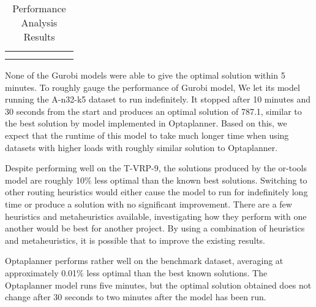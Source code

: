 \begin{table}[!ht]
\begin{tabular}{|l|l|l|l|l|l|l|}
                                                                                                                              &                         &                         &                               &                         &                          &                         \\
                                                                                                                              &                         &                         &                               &                         &                          &                         \\ \hline
\end{tabular}
\caption{Performance Analysis Results}
\label{table:results}
\end{table}

None of the Gurobi models were able to give the optimal solution within 5 minutes. To roughly gauge the performance of Gurobi model,
We let its model running the A-n32-k5 dataset to run indefinitely. It stopped after 10 minutes and 30 seconds from the start and produces an optimal solution of
787.1, similar to the best solution by model implemented in Optaplanner. Based on this, we expect that the runtime of this model to take much longer time
when using datasets with higher loads with roughly similar solution to Optaplanner.

Despite performing well on the T-VRP-9, the solutions produced by the or-tools model are roughly
10\% less optimal than the known best solutions. Switching to other routing heuristics would either cause the model to run
 for indefinitely long time or produce a solution with no significant improvement.
There are a few heuristics and metaheuristics available, investigating how they perform with one another would be best for
another project. By using a combination of heuristics and metaheuristics, it is possible that to improve the existing results.

Optaplanner performs rather well on the benchmark dataset, averaging at approximately 0.01\% less optimal than the best
known solutions. The Optaplanner model runs five minutes, but the optimal solution obtained does not change after
30 seconds to two minutes after the model has been run.

